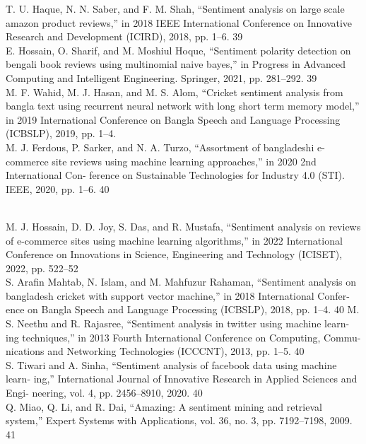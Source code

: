 \documentclass[conference]{IEEEtran}
\begin{document}
\begin{thebibliography}{00}

T. U. Haque, N. N. Saber, and F. M. Shah, “Sentiment analysis on large scale amazon product reviews,” in 2018 IEEE International Conference on Innovative Research and Development (ICIRD), 2018, pp. 1–6. 39
\\
E. Hossain, O. Sharif, and M. Moshiul Hoque, “Sentiment polarity detection on
bengali book reviews using multinomial naive bayes,” in Progress in Advanced
Computing and Intelligent Engineering. Springer, 2021, pp. 281–292.
39
\\
M. F. Wahid, M. J. Hasan, and M. S. Alom, “Cricket sentiment analysis from
bangla text using recurrent neural network with long short term memory model,”
in 2019 International Conference on Bangla Speech and Language Processing
(ICBSLP), 2019, pp. 1–4.
\\

M. J. Ferdous, P. Sarker, and N. A. Turzo, “Assortment of bangladeshi e-commerce
site reviews using machine learning approaches,” in 2020 2nd International Con-
ference on Sustainable Technologies for Industry 4.0 (STI). IEEE, 2020, pp.
1–6.
40

\\
M. J. Hossain, D. D. Joy, S. Das, and R. Mustafa, “Sentiment analysis on reviews
of e-commerce sites using machine learning algorithms,” in 2022 International
Conference on Innovations in Science, Engineering and Technology (ICISET),
2022, pp. 522–52
\\
S. Arafin Mahtab, N. Islam, and M. Mahfuzur Rahaman, “Sentiment analysis on
bangladesh cricket with support vector machine,” in 2018 International Confer-
ence on Bangla Speech and Language Processing (ICBSLP), 2018, pp. 1–4.
40
M. S. Neethu and R. Rajasree, “Sentiment analysis in twitter using machine learn-
ing techniques,” in 2013 Fourth International Conference on Computing, Commu-
nications and Networking Technologies (ICCCNT), 2013, pp. 1–5.
40
\\

S. Tiwari and A. Sinha, “Sentiment analysis of facebook data using machine learn-
ing,” International Journal of Innovative Research in Applied Sciences and Engi-
neering, vol. 4, pp. 2456–8910, 2020.
40
\\

Q. Miao, Q. Li, and R. Dai, “Amazing: A sentiment mining and retrieval system,”
Expert Systems with Applications, vol. 36, no. 3, pp. 7192–7198, 2009.
41
\\


\end{thebibliography}
\end{document}
